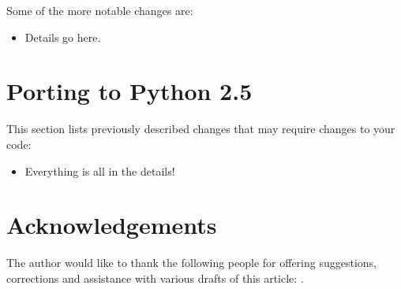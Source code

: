 \documentclass{howto}
\begin{document}
Some of the more notable changes are:

\begin{itemize}

\item Details go here.

\end{itemize}


\section{Porting to Python 2.5}

This section lists previously described changes that may require
changes to your code:

\begin{itemize}

\item Everything is all in the details!

\end{itemize}


\section{Acknowledgements \label{acks}}

The author would like to thank the following people for offering
suggestions, corrections and assistance with various drafts of this
article: .
\end{document}
